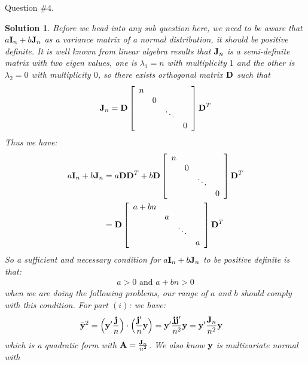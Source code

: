 \documentclass[11pt]{article}
\newtheorem{sol}{Solution}
\begin{document}
Question $\# 4$.
\begin{sol}
	Before we head into any sub question here, we need to be aware that $a{\bf I}_n + b{\bf J}_n$ as a variance matrix of a normal distribution, it should be positive definite.\vskip 2mm
	It is well known from linear algebra results that ${\bf J}_n$ is a semi-definite matrix with two eigen values, one is $\lambda_1 = n$ with multiplicity $1$ and the other is $\lambda_2 = 0$ with multiplicity $0$, so there exists orthogonal matrix ${\bf D}$ such that
	\begin{align*}
		{\bf J}_n = {\bf D}\left[\begin{array}{cccc} n & & & \\ &0&&\\ &&\ddots& \\ &&&0 \end{array}\right]{\bf D}^T
	\end{align*}	
	Thus we have:
	\begin{align*}
		a{\bf I}_n + b{\bf J}_n &= a{\bf D}{\bf D}^T + b{\bf D}\left[\begin{array}{cccc} n & & & \\ &0&&\\ &&\ddots& \\ &&&0 \end{array}\right]{\bf D}^T\\
		&= {\bf D}\left[\begin{array}{cccc} a + bn & & & \\ &a&&\\ &&\ddots& \\ &&&a \end{array}\right]{\bf D}^T
	\end{align*}
	So a sufficient and necessary condition for $a{\bf I}_n + b{\bf J}_n$ to be positive definite is that:
	\begin{align*}
		a > 0 \text{ and } a + bn > 0
	\end{align*}
	when we are doing the following problems, our range of $a$ and $b$ should comply with this condition.\vskip 2mm
	For part $(i)$:\vskip 2mm
	we have:
	\begin{align*}
		\bar{{\bf y}}^2 &=\Big({\bf y}'\frac{{\bf j}}{n}\Big)\cdot \Big(\frac{{\bf j}'}{n}{\bf y}\Big) =  {\bf y}'\frac{{\bf j}{\bf j}'}{n^2}{\bf y} = {\bf y}'\frac{{\bf J}_n}{n^2}{\bf y}
	\end{align*}
	which is a quadratic form with ${\bf A} = \frac{{\bf J}_n}{n^2}$. We also know ${\bf y}$ is multivariate normal with 
	\begin{align*}

\end{align*}
\end{sol}
\end{document}
